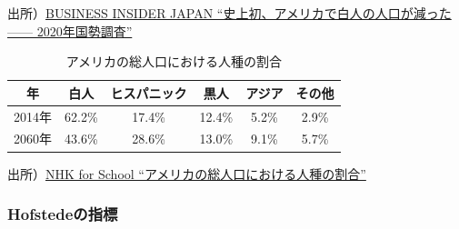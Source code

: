 \documentclass[
]{book}
\begin{document}
出所）\href{https://www.businessinsider.jp/post-240340}{BUSINESS INSIDER JAPAN ``史上初、アメリカで白人の人口が減った------ 2020年国勢調査''}

\begin{table}

\caption{\label{tab:USPOPULATION}アメリカの総人口における人種の割合}
\centering
\begin{tabular}[t]{c|c|c|c|c|c}
\hline
年 & 白人 & ヒスパニック & 黒人 & アジア & その他\\
\hline
2014年 & 62.2\% & 17.4\% & 12.4\% & 5.2\% & 2.9\%\\
\hline
2060年 & 43.6\% & 28.6\% & 13.0\% & 9.1\% & 5.7\%\\
\hline
\end{tabular}
\end{table}

出所）\href{https://www.nhk.or.jp/school/syakai/10min_tiri/kyouzai/001601.pdf}{NHK for School ``アメリカの総人口における人種の割合''}

\hypertarget{hofstedeux306eux6307ux6a19}{%
\subsubsection{Hofstedeの指標}\label{hofstedeux306eux6307ux6a19}}
\end{document}

